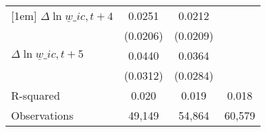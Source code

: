 {\begin{tabular}{l*{3}{c}}
[1em]
$\Delta \ln \underline{w}\_{ic,t+4}$&   0.0251         &   0.0212         &                  \\
          & (0.0206)         & (0.0209)         &                  \\
[1em]
$\Delta \ln \underline{w}\_{ic,t+5}$&   0.0440         &   0.0364         &                  \\
          & (0.0312)         & (0.0284)         &                  \\
\hline
R-squared &    0.020         &    0.019         &    0.018         \\
Observations&   49,149         &   54,864         &   60,579         \\
\hline\hline
\end{tabular}
}
